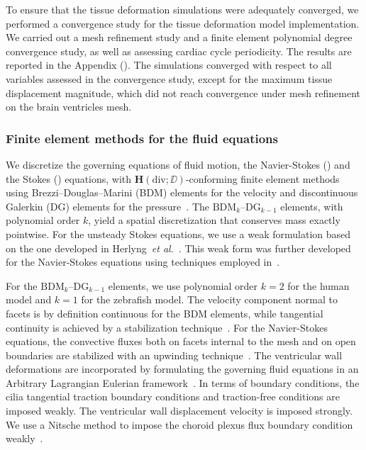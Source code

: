 \documentclass{template}
\begin{document}
To ensure that the tissue deformation simulations were adequately converged, we performed
a convergence study for the tissue deformation model implementation. We 
carried out a mesh refinement study and a finite element polynomial degree 
convergence study, as well as assessing cardiac cycle periodicity. The results
are reported in the Appendix (). The
simulations converged with respect to all variables assessed in the convergence
study, except for the maximum tissue displacement magnitude, which did not
reach convergence under mesh refinement on the brain ventricles mesh.

\subsubsection{Finite element methods for the fluid equations}
We discretize the governing equations of fluid motion,
the Navier-Stokes ()
and the Stokes ()
equations, with $\bm{H}(\mathrm{div}; \DD)$-conforming finite element methods
using Brezzi--Douglas--Marini (BDM) elements for the velocity
and discontinuous Galerkin (DG)
elements for the pressure~\citep{Brezzi1985TwoProblems,Nedelec1986AIR3}.
The $\mathrm{BDM}_k$--$\mathrm{DG}_{k-1}$ elements, with polynomial order $k$,
yield a spatial discretization that conserves mass exactly pointwise.
For the unsteady Stokes equations, we use a weak formulation
based on the one developed in
Herlyng~\emph{et al.}~\citep{Herlyng2025AdvectionDiffusion}.
This weak form was further developed for the Navier-Stokes equations
using techniques employed in~\citep{Schroeder2018Towards,di2011mathematical}.

For the $\mathrm{BDM}_k$--$\mathrm{DG}_{k-1}$ elements, we use
polynomial order $k=2$ for the human model and $k=1$ for the 
zebrafish model. The velocity component normal to facets is by definition 
continuous for the BDM elements, while tangential continuity is achieved
by a stabilization technique~\citep{Hong2016AEquations}. 
For the Navier-Stokes equations, the convective fluxes both on facets
internal to the mesh and on open boundaries are stabilized with
an upwinding technique~\citep{Schroeder2018Towards,
di2011mathematical}. The ventricular wall deformations
are incorporated by formulating the governing fluid equations
in an Arbitrary Lagrangian Eulerian framework~\citep{Scovazzi2007LectureNotes,Duarte2004ALE}.
In terms of boundary conditions, the cilia tangential traction
boundary conditions and traction-free conditions are imposed weakly.
The ventricular wall displacement velocity is imposed strongly.
We use a Nitsche method to impose the choroid plexus flux boundary
condition weakly~\citep{Nitsche1971UberSind, benzaken2024constructing}.
\end{document}
